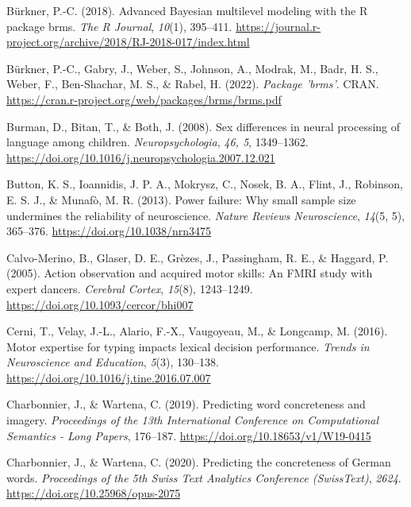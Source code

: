 \documentclass[
  12pt,
  man,floatsintext]{apa7}
\newlength{\cslhangindent}
\newlength{\cslentryspacingunit} %
\newenvironment{CSLReferences}[2] %
 {%
  \setlength{\parindent}{0pt}
  \ifodd #1
  \let\oldpar\par
  \def\par{\hangindent=\cslhangindent\oldpar}
  \fi
  \setlength{\parskip}{#2\cslentryspacingunit}
 }%
 {}
\begin{document}
\begin{CSLReferences}{1}{0}
\leavevmode{}%
Bürkner, P.-C. (2018). Advanced {Bayesian} multilevel modeling with the {R} package {brms}. \emph{The R Journal}, \emph{10}(1), 395--411. \url{https://journal.r-project.org/archive/2018/RJ-2018-017/index.html}

\leavevmode{}%
Bürkner, P.-C., Gabry, J., Weber, S., Johnson, A., Modrak, M., Badr, H. S., Weber, F., Ben-Shachar, M. S., \& Rabel, H. (2022). \emph{Package '{brms}'}. {CRAN}. \url{https://cran.r-project.org/web/packages/brms/brms.pdf}

\leavevmode{}%
Burman, D., Bitan, T., \& Both, J. (2008). Sex differences in neural processing of language among children. \emph{Neuropsychologia}, \emph{46, 5}, 1349--1362. \url{https://doi.org/10.1016/j.neuropsychologia.2007.12.021}

\leavevmode{}%
Button, K. S., Ioannidis, J. P. A., Mokrysz, C., Nosek, B. A., Flint, J., Robinson, E. S. J., \& Munafò, M. R. (2013). Power failure: {Why} small sample size undermines the reliability of neuroscience. \emph{Nature Reviews Neuroscience}, \emph{14}(5, 5), 365--376. \url{https://doi.org/10.1038/nrn3475}

\leavevmode{}%
Calvo-Merino, B., Glaser, D. E., Grèzes, J., Passingham, R. E., \& Haggard, P. (2005). Action observation and acquired motor skills: {An} {FMRI} study with expert dancers. \emph{Cerebral Cortex}, \emph{15}(8), 1243--1249. \url{https://doi.org/10.1093/cercor/bhi007}

\leavevmode{}%
Cerni, T., Velay, J.-L., Alario, F.-X., Vaugoyeau, M., \& Longcamp, M. (2016). Motor expertise for typing impacts lexical decision performance. \emph{Trends in Neuroscience and Education}, \emph{5}(3), 130--138. \url{https://doi.org/10.1016/j.tine.2016.07.007}

\leavevmode{}%
Charbonnier, J., \& Wartena, C. (2019). Predicting word concreteness and imagery. \emph{Proceedings of the 13th {International Conference} on {Computational Semantics} - {Long Papers}}, 176--187. \url{https://doi.org/10.18653/v1/W19-0415}

\leavevmode{}%
Charbonnier, J., \& Wartena, C. (2020). Predicting the concreteness of {German} words. \emph{Proceedings of the 5th {Swiss Text Analytics Conference} ({SwissText})}, \emph{2624}. \url{https://doi.org/10.25968/opus-2075}


\end{CSLReferences}
\end{document}
